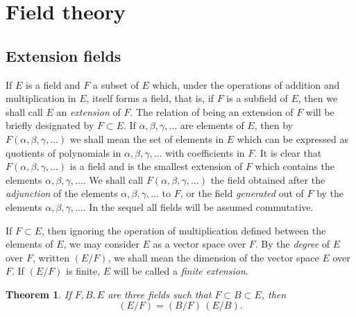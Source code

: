 \documentclass[10pt,leqno]{article}
\newtheorem{theo}{Theorem}
\theoremstyle{definition}
\begin{document}
\section{Field theory}


\subsection{Extension fields}

If $E$ is a field and $F$ a subset of $E$ which, under the operations of addition and multiplication in $E$, itself forms a field, that is, if $F$ is a subfield of $E$, then we shall call $E$ an \emph{extension} of $F$.
The relation of being an extension of $F$ will be briefly designated by $F \subset E$.
If $\alpha, \beta, \gamma, \ldots$ are elements of $E$, then by $F(\alpha, \beta, \gamma, \ldots)$ we shall mean the set of elements in $E$ which can be expressed as quotients of polynomials in $\alpha, \beta, \gamma, \ldots$ with coefficients in $F$.
It is clear that $F(\alpha, \beta, \gamma, \ldots)$ is a field and is the smallest extension of $F$ which contains the elements $\alpha, \beta, \gamma, \ldots$.
We shall call $F(\alpha, \beta, \gamma, \ldots)$ the field obtained after the \emph{adjunction} of the elements $\alpha, \beta, \gamma, \ldots$ to $F$, or the field \emph{generated} out of $F$ by the elements $\alpha, \beta, \gamma, \ldots$.
In the sequel all fields will be assumed commutative.

If $F \subset E$, then ignoring the operation of multiplication defined between the elements of $E$, we may consider $E$ as a vector space over $F$.
By the \emph{degree} of $E$ over $F$, written $(E/F)$, we shall mean the dimension of the vector space $E$ over $F$.
If $(E/F)$ is finite, $E$ will be called a \emph{finite extension}.


\begin{theo}
\label{theo:si}
If $F, B, E$ are three fields such that $F \subset B \subset E$, then
\[
(E/F) = (B/F) \, (E/B).
\]
\end{theo}
\end{document}
